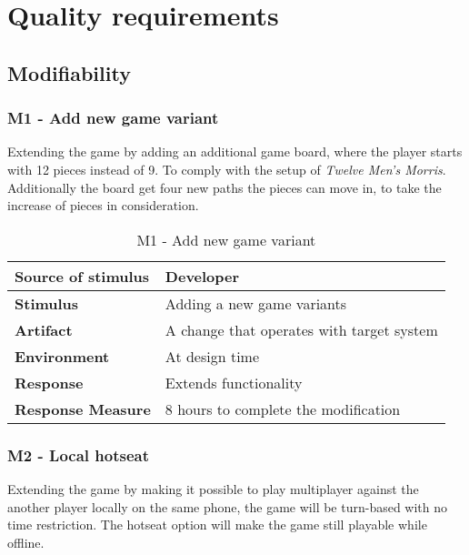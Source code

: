 \newpage

\section{Quality requirements}

\subsection{Modifiability}
\label{section:quality_mod}

\subsubsection{M1 - Add new game variant}

Extending the game by adding an additional game board, where the player starts with 12 pieces instead of 9. To comply  with the setup of \emph{Twelve Men's Morris}. Additionally the board get four new paths the pieces can move in, to take the increase of pieces in consideration.

\begin{table}[h!]
\begin{tabular}{ | p{110pt} | p{250pt}  |}
\hline
\bf Source of stimulus &  Developer  \\ \hline
\bf Stimulus & Adding a new game variants \\ \hline 
\bf Artifact & A change that operates with target system  \\  \hline
\bf Environment & At design time \\ \hline
\bf Response & Extends functionality \\ \hline
\bf Response Measure & 8 hours to complete the modification \\ \hline

\end{tabular}
\caption{M1 - Add new game variant}
\end{table}

\pagebreak

\subsubsection{M2 - Local hotseat}

Extending the game by making it possible to play multiplayer against the another player locally on the same phone, the game will be turn-based with no time restriction. The hotseat option will make the game still playable while offline.


